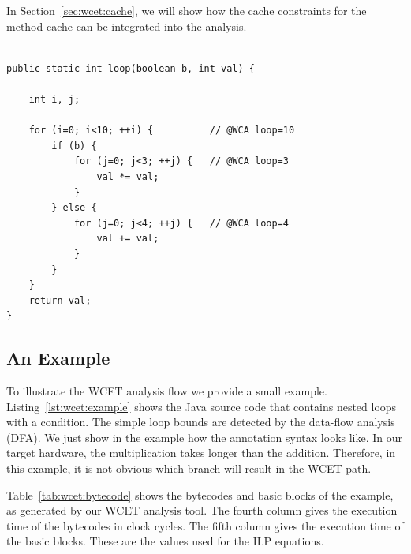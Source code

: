 In Section~\ref{sec:wcet:cache}, we will show how the cache
constraints for the method cache can be integrated into the analysis.



\begin{lstlisting}[float=t, caption={The example used for the WCET analysis},label=lst:wcet:example]

public static int loop(boolean b, int val) {

    int i, j;

    for (i=0; i<10; ++i) {          // @WCA loop=10
        if (b) {
            for (j=0; j<3; ++j) {   // @WCA loop=3
                val *= val;
            }
        } else {
            for (j=0; j<4; ++j) {   // @WCA loop=4
                val += val;
            }
        }
    }
    return val;
}
\end{lstlisting}

\subsection{An Example}

To illustrate the WCET analysis flow we provide a small example.
Listing~\ref{lst:wcet:example} shows the Java source code that
contains nested loops with a condition. The simple loop bounds are
detected by the data-flow analysis (DFA). We just show in the example
how the annotation syntax looks like. In our target hardware, the
multiplication takes longer than the addition. Therefore, in this
example, it is not obvious which branch will result in the WCET path.

Table~\ref{tab:wcet:bytecode} shows the bytecodes and basic blocks of
the example, as generated by our WCET analysis tool. The fourth
column gives the execution time of the bytecodes in clock cycles. The
fifth column gives the execution time of the basic blocks. These are
the values used for the ILP equations.

